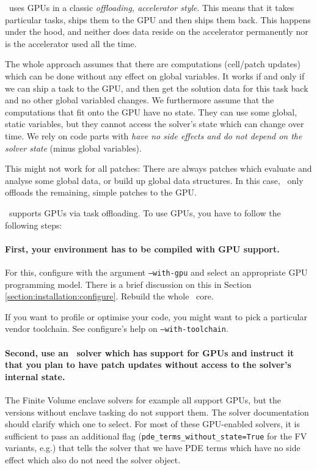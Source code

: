 \begin{definition}
 \ExaHyPE\ uses GPUs in a classic \emph{offloading, accelerator style}.
 This means that it takes particular tasks, ships them to the GPU and then ships
 them back. 
 This happens under the hood, and neither does data reside on the accelerator
 permanently nor is the accelerator used all the time.
 
 The whole approach assumes that there are computations (cell/patch updates)
 which can be done without any effect on global variables. 
 It works if and only if we can ship a task to the GPU, and then get the
 solution data for this task back and no other global variabled changes.
 We furthermore assume that the computations that fit onto the GPU have no
 state.
 They can use some global, static variables, but they cannot access the solver's
 state which can change over time. 
 We rely on code parts with \emph{have no side effects and do not depend on
 the solver state} (minus global variables).
 
 This might not work for all patches: There are always patches which evaluate
 and analyse some global data, or build up global data structures. 
 In this case, \ExaHyPE\ only offloads the remaining, simple patches to the GPU. 
\end{definition}


\noindent
\ExaHyPE\ supports GPUs via task offloading.
To use GPUs, you have to follow the following steps:





\paragraph{First, your environment has to be compiled with GPU support.}
For this, configure with the argument \texttt{--with-gpu} and select an
appropriate GPU programming model.
There is a brief discussion on this in Section
\ref{section:installation:configure}.
Rebuild the whole \Peano\ core.

\begin{remark}
 If you want to profile or optimise your code, you might want to pick a
 particular vendor toolchain. See configure's help on \texttt{--with-toolchain}.
\end{remark}



\paragraph{Second, use an \ExaHyPE\ solver which has support for GPUs and instruct
it that you plan to have patch updates without access to the solver's
internal state.}
The Finite Volume enclave solvers for example all support GPUs, but the
versions without enclave tasking do not support them.
The solver documentation should clarify which one to select.
For most of these GPU-enabled solvers, it is sufficient to pass an additional
flag (\texttt{pde\_terms\_without\_state=True} for the FV variants, e.g.)
that tells the solver that we have PDE terms which have no side effect which
also do not need the solver object.


